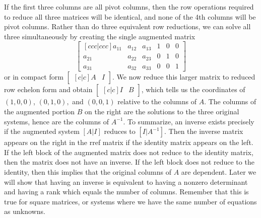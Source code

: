 If the first three columns are all pivot columns, then the row operations required to reduce all three matrices will be identical, and none of the 4th columns will be pivot columns.  Rather than do three equivalent row reductions, we can solve all three simultaneously by creating the single augmented matrix 
$$\begin{bmatrix}[ccc|ccc]
a_{11}&a_{12}&a_{13}&1&0&0\\ 
a_{21}&a_{22}&a_{23}&0&1&0\\ 
a_{31}&a_{32}&a_{33}&0&0&1 
\end{bmatrix} $$or in compact form $\begin{bmatrix}[c|c]A &I\end{bmatrix}$. We now reduce this larger matrix to reduced row echelon form and obtain $\begin{bmatrix}[c|c]I &B\end{bmatrix}$, which tells us the coordinates of $(1,0,0)$, $(0,1,0),$ and  $(0,0,1)$ relative to the columns of $A$. 
The columns of the augmented portion $B$ on the right are the solutions to the three original systems, hence are the columns of $A^{-1}$.
To summarize, an inverse exists precisely if the augmented system $[A|I]$ reduces to $[I|A^{-1}]$. 
Then the inverse matrix appears on the right in the rref matrix if the identity matrix appears on the left.
If the left block of the augmented matrix does not reduce to the identity matrix, then the matrix does not have an inverse.
If the left block does not reduce to the identity, then this implies that the original columns of $A$ are dependent.  
Later we will show that having an inverse is equivalent to having a nonzero determinant and having a rank which equals the number of columns. Remember that this is true for square matrices, or systems where we have the same number of equations as unknowns.

